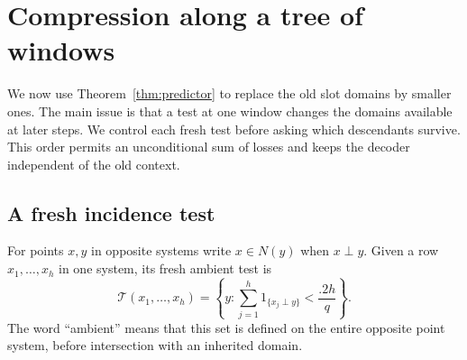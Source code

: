 \section{Compression along a tree of windows}
\label{sec:compression-tree}

We now use Theorem~\ref{thm:predictor} to replace the old slot domains by
smaller ones.  The main issue is that a test at one window changes the
domains available at later steps.  We control each fresh test before
asking which descendants survive.  This order permits an unconditional
sum of losses and keeps the decoder independent of the old context.

\subsection{A fresh incidence test}

For points $x,y$ in opposite systems write $x\in N(y)$ when $x\perp y$.
Given a row $x_1,\ldots,x_h$ in one system, its fresh ambient test is
\begin{equation}\label{eq:fresh-test-set}
 \mathcal T(x_1,\ldots,x_h)
 =\left\{y:\sum_{j=1}^h1_{\{x_j\perp y\}}<\frac{.2h}{q}\right\}.
\end{equation}
The word ``ambient'' means that this set is defined on the entire
opposite point system, before intersection with an inherited domain.

